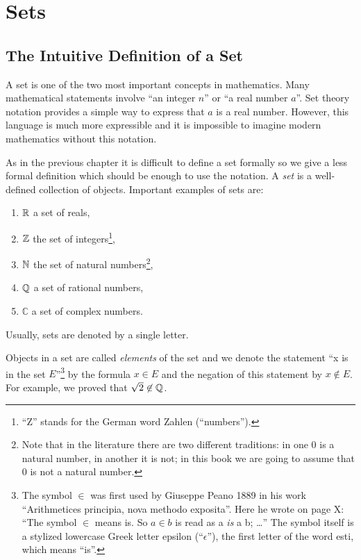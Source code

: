 \chapter{Sets}
\label{chapter:sets}
\section{The Intuitive Definition of a Set}
A set is one of the two most important concepts in mathematics. Many mathematical
statements involve ``an integer $n$'' or ``a real number $a$''. Set theory
notation provides a simple way to express that $a$ is a real number. However,
this language is much more expressible and it is impossible to imagine modern
mathematics without this notation.

As in the previous chapter it is difficult to define a set formally so we give
a less formal definition which should be enough to use the notation.
A \emph{set} is a well-defined collection of objects. Important examples of
sets are:
\begin{enumerate}
  \item ${\mathbb{R}}$ a set of reals,
  \item ${\mathbb{Z}}$ the set of integers\footnote{``Z'' stands for the German word
    Zahlen (``numbers'').},
  \item ${\mathbb{N}}$ the set of natural numbers\footnote{%
      Note that in the literature
      there are two different traditions: in one $0$ is a natural number, in
      another it is not; in this book we are going to assume that $0$ is not a
      natural number.
    },
  \item ${\mathbb{Q}}$ a set of rational numbers,
  \item $\mathbb{C}$ a set of complex numbers.
\end{enumerate}
Usually, sets are denoted by a single letter.

Objects in a set are called \emph{elements} of the set and we denote the
statement ``x is in the set $E$''\footnote{%
  The symbol $\in$ was first used by Giuseppe Peano 1889 in his work
  ``Arithmetices principia, nova methodo exposita''. Here he wrote on page X:
  ``The symbol $\in$ means is. So $a \in b$ is read as a \emph{is} a b;
  \dots''
  The symbol itself is a stylized lowercase Greek letter epsilon
  (``$\epsilon$''), the first letter of the word  \textgreek{esti}, which means
  ``is''.
} 
by the formula $x \in E$ and the negation of this statement by $x \not\in E$.
For example, we proved that $\sqrt{2} \not\in {\mathbb{Q}}$.



